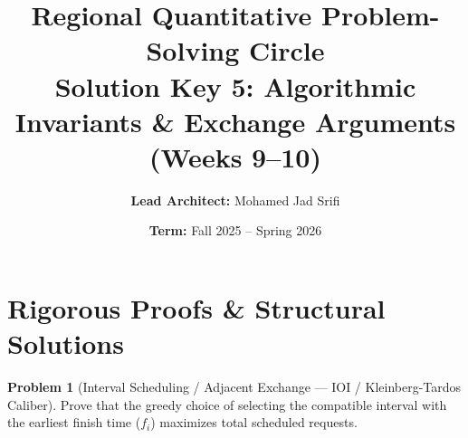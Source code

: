 \documentclass[11pt, a4paper]{article}
\theoremstyle{definition}
\newtheorem{problem}{Problem}
\theoremstyle{plain}
\begin{document}
\title{\vspace{-1.5cm}\textbf{Regional Quantitative Problem-Solving Circle} \\ \Large Solution Key 5: Algorithmic Invariants \& Exchange Arguments (Weeks 9--10)}
\author{\textbf{Lead Architect:} Mohamed Jad Srifi}
\date{\textbf{Term:} Fall 2025 -- Spring 2026}
\maketitle

\section*{Rigorous Proofs \& Structural Solutions}

\begin{problem}[Interval Scheduling / Adjacent Exchange --- IOI / Kleinberg-Tardos Caliber]
Prove that the greedy choice of selecting the compatible interval with the earliest finish time ($f_i$) maximizes total scheduled requests.
\end{problem}
\end{document}
